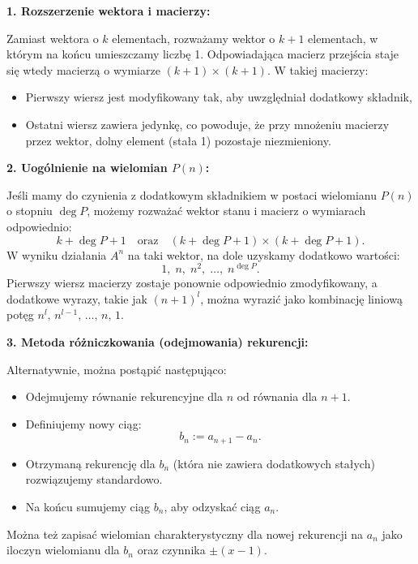 \documentclass[12pt]{article}
\begin{document}
\bigskip

\textbf{1. Rozszerzenie wektora i macierzy:}

Zamiast wektora o \( k \) elementach, rozważamy wektor o \( k+1 \) elementach, w którym na końcu umieszczamy liczbę 1. Odpowiadająca macierz przejścia staje się wtedy macierzą o wymiarze \( (k+1) \times (k+1) \). W takiej macierzy:
\begin{itemize}
    \item Pierwszy wiersz jest modyfikowany tak, aby uwzględniał dodatkowy składnik,
    \item Ostatni wiersz zawiera jedynkę, co powoduje, że przy mnożeniu macierzy przez wektor, dolny element (stała 1) pozostaje niezmieniony.
\end{itemize}

\bigskip

\textbf{2. Uogólnienie na wielomian \( P(n) \):}

Jeśli mamy do czynienia z dodatkowym składnikiem w postaci wielomianu \( P(n) \) o stopniu \(\deg P\), możemy rozważać wektor stanu i macierz o wymiarach odpowiednio:
\[
k + \deg P + 1 \quad \text{oraz} \quad (k + \deg P + 1) \times (k + \deg P + 1).
\]
W wyniku działania \( A^n \) na taki wektor, na dole uzyskamy dodatkowo wartości:
\[
1,\; n,\; n^2,\; \dots,\; n^{\deg P}.
\]
Pierwszy wiersz macierzy zostaje ponownie odpowiednio zmodyfikowany, a dodatkowe wyrazy, takie jak \((n+1)^l\), można wyrazić jako kombinację liniową potęg \( n^l,\, n^{l-1},\, \dots,\, n,\, 1 \).

\bigskip

\textbf{3. Metoda różniczkowania (odejmowania) rekurencji:}

Alternatywnie, można postąpić następująco:
\begin{itemize}
    \item Odejmujemy równanie rekurencyjne dla \( n \) od równania dla \( n+1 \).
    \item Definiujemy nowy ciąg: 
    \[
    b_n := a_{n+1} - a_n.
    \]
    \item Otrzymaną rekurencję dla \( b_n \) (która nie zawiera dodatkowych stałych) rozwiązujemy standardowo.
    \item Na końcu sumujemy ciąg \( b_n \), aby odzyskać ciąg \( a_n \). 
\end{itemize}

Można też zapisać wielomian charakterystyczny dla nowej rekurencji na \( a_n \) jako iloczyn wielomianu dla \( b_n \) oraz czynnika \( \pm (x-1) \).
\end{document}

